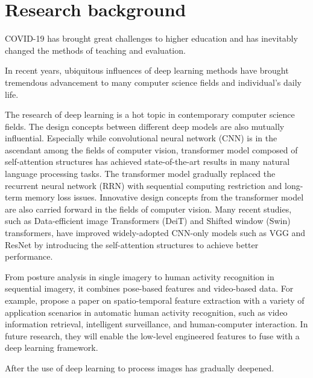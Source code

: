 \section{Research background}
\label{sec:Research background}
COVID-19 has brought great challenges to higher education and has inevitably changed the methods of teaching and evaluation.

In recent years, ubiquitous influences of deep learning methods have brought tremendous advancement to many computer science fields and individual's daily life.

The research of deep learning is a hot topic in contemporary computer science fields.
The design concepts between different deep models are also mutually influential.
Especially while convolutional neural network (CNN) is in the ascendant among the fields of computer vision, transformer model composed of self-attention structures has achieved state-of-the-art results in many natural language processing tasks.
The transformer model gradually replaced the recurrent neural network (RRN) with sequential computing restriction and long-term memory loss issues.
Innovative design concepts from the transformer model are also carried forward in the fields of computer vision.
Many recent studies, such as Data-efficient image Transformers (DeiT) and Shifted window (Swin) transformers, have improved widely-adopted CNN-only models such as VGG and ResNet by introducing the self-attention structures to achieve better performance.


\citet{thrasher2011mood}

From posture analysis in single imagery to human activity recognition in sequential imagery, it combines pose-based features and video-based data.
For example, \citet{yao2016spatio} propose a paper on spatio-temporal feature extraction with a variety of application scenarios in automatic human activity recognition, such as video information retrieval, intelligent surveillance, and human-computer interaction.
In future research, they will enable the low-level engineered features to fuse with a deep learning framework.

After the use of deep learning to process images has gradually deepened.
